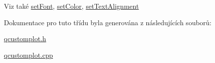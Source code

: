 \begin{DoxySeeAlso}{Viz také}
\hyperlink{classQCPItemText_a94ad60ebe04f5c07c35e7c2029e96b1f}{set\+Font}, \hyperlink{classQCPItemText_aa51efc0841fe52da9eaf8aff6fc8a8b2}{set\+Color}, \hyperlink{classQCPItemText_ab5bc0684c4d1bed81949a11b34dba478}{set\+Text\+Alignment} 
\end{DoxySeeAlso}


Dokumentace pro tuto třídu byla generována z následujících souborů\+:\begin{DoxyCompactItemize}
\item 
\hyperlink{qcustomplot_8h}{qcustomplot.\+h}\item 
\hyperlink{qcustomplot_8cpp}{qcustomplot.\+cpp}\end{DoxyCompactItemize}
